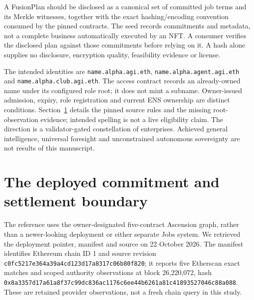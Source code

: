\documentclass[11pt,letterpaper]{article}
\begin{document}
A FusionPlan should be disclosed as a canonical set of committed job terms and its Merkle witnesses, together with the exact hashing/encoding convention consumed by the pinned contracts. The seed records commitments and metadata, not a complete business automatically executed by an NFT. A consumer verifies the disclosed plan against those commitments before relying on it. A hash alone supplies no disclosure, encryption quality, feasibility evidence or license.

The intended identities are \texttt{name.\allowbreak{}alpha.\allowbreak{}agi.\allowbreak{}eth}, \texttt{name.\allowbreak{}alpha.\allowbreak{}agent.\allowbreak{}agi.\allowbreak{}eth} and \texttt{name.\allowbreak{}alpha.\allowbreak{}club.\allowbreak{}agi.\allowbreak{}eth}. The access contract records an already-owned name under its configured role root; it does not mint a subname. Owner-issued admission, expiry, role registration and current ENS ownership are distinct conditions. Section~\ref{sec:contracts} details the pinned source rules and the missing root-observation evidence; intended spelling is not a live eligibility claim. The direction is a validator-gated constellation of enterprises. Achieved general intelligence, universal foresight and unconstrained autonomous sovereignty are not results of this manuscript.

\section{The deployed commitment and settlement boundary}
\label{sec:contracts}
The reference uses the owner-designated five-contract Ascension graph, rather than a newer-looking deployment or either separate Jobs system. We retrieved the deployment pointer, manifest and source on 22 October 2026. The manifest identifies Ethereum chain ID 1 and source revision \texttt{c0fc5217\allowbreak{}e364a39a\allowbreak{}4cd123d1\allowbreak{}7a8317c0\allowbreak{}6b80f820}; it reports five Etherscan exact matches and scoped authority observations at block 26,220,072, hash \texttt{0x8a3357d17\allowbreak{}a61a8f37\allowbreak{}c99dc836\allowbreak{}ac1176c6\allowbreak{}ee44b626\allowbreak{}1a81c418\allowbreak{}93527046\allowbreak{}c88a088}.\cite{manifest,deployment,ascensionsource} These are retained provider observations, not a fresh chain query in this study.
\end{document}
